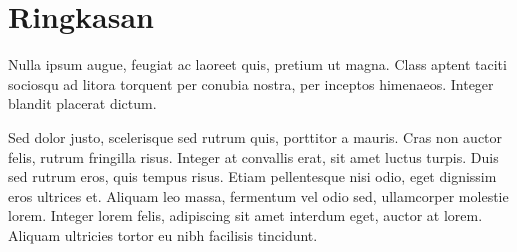 \section{Ringkasan}
Nulla ipsum augue, feugiat ac laoreet quis, pretium ut magna. Class aptent taciti sociosqu ad litora torquent per conubia nostra, per inceptos himenaeos. Integer blandit placerat dictum.

Sed dolor justo, scelerisque sed rutrum quis, porttitor a mauris. Cras non auctor felis, rutrum fringilla risus. Integer at convallis erat, sit amet luctus turpis. Duis sed rutrum eros, quis tempus risus. Etiam pellentesque nisi odio, eget dignissim eros ultrices et. Aliquam leo massa, fermentum vel odio sed, ullamcorper molestie lorem. Integer lorem felis, adipiscing sit amet interdum eget, auctor at lorem. Aliquam ultricies tortor eu nibh facilisis tincidunt.
